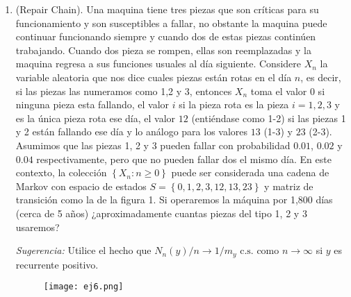 \documentclass[12pt,a4paper]{article}
\newcommand{\braces}[1]{\left\{#1\right\}}
\theoremstyle{definition}
\begin{document}
\begin{enumerate}
		\item (Repair Chain). Una maquina tiene tres piezas que son críticas para su funcionamiento y son susceptibles a fallar, no obstante la maquina puede continuar funcionando siempre y cuando dos de estas piezas continúen trabajando. Cuando dos pieza se rompen, ellas son reemplazadas y la maquina regresa a sus funciones usuales al día siguiente. Considere $X_n$ la variable aleatoria que nos dice cuales piezas están rotas en el día $n$, es decir, si las piezas las numeramos como 1,2 y 3, entonces $X_n$ toma el valor $0$ si ninguna pieza esta fallando, el valor $i$ si la pieza  rota es la pieza $i=1,2,3$ y es la única pieza rota ese día, el valor $12$ (entiéndase como 1-2) si las piezas 1 y 2 están fallando ese día y lo análogo para los valores $13$ (1-3) y $23$ (2-3). Asumimos que las piezas 1, 2 y 3 pueden fallar con probabilidad $0.01$, $0.02$ y $0.04$ respectivamente, pero que no pueden fallar dos el mismo día. En este contexto, la colección $\braces{X_n:n\geq 0}$ puede ser considerada una cadena de Markov con espacio de estados $S=\braces{0,1,2,3,12,13,23}$ y matriz de transición como la de la figura 1. Si operaremos la máquina por 1,800 días (cerca de 5 años) ¿aproximadamente cuantas piezas del tipo 1, 2 y 3 usaremos?
		
		\emph{Sugerencia:} Utilice el hecho que $N_n(y)/n\rightarrow 1/m_y \text{  c.s.}$ como $n\rightarrow \infty$ si $y$ es recurrente positivo.
		\begin{figure}[H]
			\centering
			\texttt{[image: ej6.png]}
			\caption{}
			\label{fig:exampl17durret}
		\end{figure}
	
	\end{enumerate}

	
\end{document}
